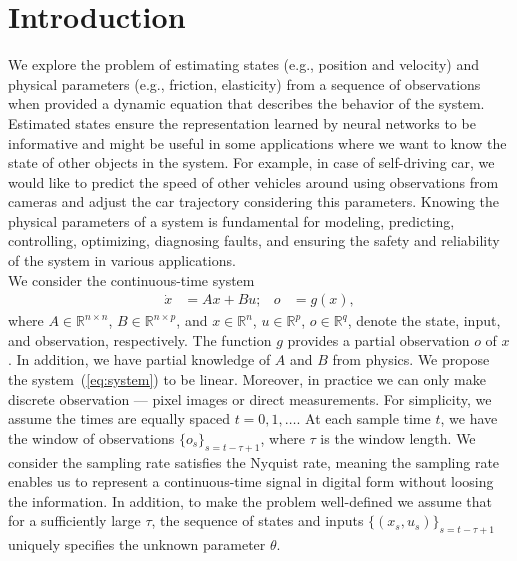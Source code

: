 \documentclass[acmtog]{techreportacmart}
\begin{document}
\section{Introduction} %
We explore the problem of estimating states (e.g., position and velocity) and physical parameters (e.g., friction, elasticity) from a sequence of observations when provided a dynamic equation that describes the behavior of the system. Estimated states ensure the representation learned by neural networks to be informative and might be useful in some applications where we want to know the state of other objects in the system. For example, in case of self-driving car, we would like to predict the speed of other vehicles around using observations from cameras and adjust the car trajectory considering this parameters. Knowing the physical parameters of a system is fundamental for modeling, predicting, controlling, optimizing, diagnosing faults, and ensuring the safety and reliability of the system in various applications.
\\
We consider the continuous-time system
\begin{align}
  \label{eq:system}
  \dot{x} &= Ax + Bu; & o &= g(x),
\end{align}
where $A \in \mathbb{R}^{n \times n}$, $B \in \mathbb{R}^{n \times p}$, and $x \in \mathbb{R}^n$, $u \in \mathbb{R}^p$, $o \in \mathbb{R}^q$, denote the state, input, and observation, respectively. The function $g$ provides a partial observation $o$ of $x$. In addition, we have partial knowledge of $A$ and $B$ from physics. We propose the system~(\ref{eq:system}) to be linear. Moreover, in practice we can only make discrete observation --- pixel images or direct measurements. For simplicity, we assume the times are equally spaced $t = 0, 1, \ldots$. At each sample time $t$, we have the window of observations $\{o_s\}_{s=t-\tau+1}$, where $\tau$ is the window length. We consider the sampling rate satisfies the Nyquist rate, meaning the sampling rate enables us to represent a continuous-time signal in digital form without loosing the information. In addition, to make the problem well-defined we assume that for a sufficiently large $\tau$, the sequence of states and inputs $\{(x_s, u_s)\}_{s=t-\tau+1}$ uniquely specifies the unknown parameter $\theta$.
\end{document}
